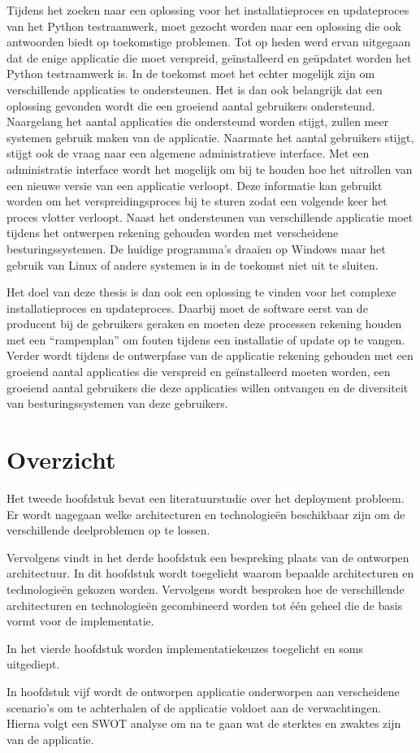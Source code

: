 Tijdens het zoeken naar een oplossing voor het installatieproces en updateproces van het Python testraamwerk, moet gezocht worden naar een oplossing die ook antwoorden biedt op toekomstige problemen.
Tot op heden werd ervan uitgegaan dat de enige applicatie die moet verspreid, geïnstalleerd en geüpdatet worden het Python testraamwerk is.
In de toekomst moet het echter mogelijk zijn om verschillende applicaties te ondersteunen.
Het is dan ook belangrijk dat een oplossing gevonden wordt die een groeiend aantal gebruikers ondersteund.
Naargelang het aantal applicaties die ondersteund worden stijgt, zullen meer systemen gebruik maken van de applicatie.
Naarmate het aantal gebruikers stijgt, stijgt ook de vraag naar een algemene administratieve interface. 
Met een administratie interface wordt het mogelijk om bij te houden hoe het uitrollen van een nieuwe versie van een applicatie verloopt.
Deze informatie kan gebruikt worden om het verspreidingsproces bij te sturen zodat een volgende keer het proces vlotter verloopt.
Naast het ondersteunen van verschillende applicatie moet tijdens het ontwerpen rekening gehouden worden met verscheidene besturingssystemen.
De huidige programma's draaien op Windows maar het gebruik van Linux of andere systemen is in de toekomst niet uit te sluiten.

Het doel van deze thesis is dan ook een oplossing te vinden voor het complexe installatieproces en updateproces.
Daarbij moet de software eerst van de producent bij de gebruikers geraken en moeten deze processen rekening houden met een ``rampenplan'' om fouten tijdens een installatie of update op te vangen.
Verder wordt tijdens de ontwerpfase van de applicatie rekening gehouden met een groeiend aantal applicaties die verspreid en geïnstalleerd moeten worden, een groeiend aantal gebruikers die deze applicaties willen ontvangen en de diversiteit van besturingssystemen van deze gebruikers.

\section{Overzicht}
Het tweede hoofdstuk bevat een literatuurstudie over het deployment probleem.
Er wordt nagegaan welke architecturen en technologieën beschikbaar zijn om de verschillende deelproblemen op te lossen.

Vervolgens vindt in het derde hoofdstuk een bespreking plaats van de ontworpen architectuur.
In dit hoofdstuk wordt toegelicht waarom bepaalde architecturen en technologieën gekozen worden.
Vervolgens wordt besproken hoe de verschillende architecturen en technologieën gecombineerd worden tot één geheel die de basis vormt voor de implementatie.

In het vierde hoofdstuk worden implementatiekeuzes toegelicht en soms uitgediept.

In hoofdstuk vijf wordt de ontworpen applicatie onderworpen aan verscheidene scenario's om te achterhalen of de applicatie voldoet aan de verwachtingen.
Hierna volgt een SWOT analyse om na te gaan wat de sterktes en zwaktes zijn van de applicatie.

